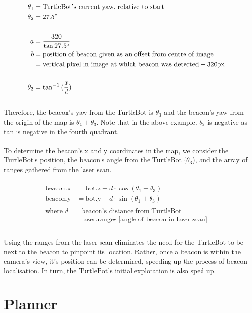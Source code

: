 \documentclass[titlepage,12pt,a4paper]{article}
\begin{document}
\begin{align*}
	\theta_1   &=  \text{TurtleBot's current yaw, relative to start} \\
	\theta_2   &=  27.5\degree \\
	\\
	a 	        &=  \frac{320}{\tan{27.5\degree}} \\ 
	b 	        &=  \text{position of beacon given as an offset from centre of image} \\
			&=  \text{vertical pixel in image at which beacon was detected} - 320\text{px} \\
	\\
	\theta_3   &= \tan^{-1}{(\frac{x}{d})} \\
\end{align*}
\\
Therefore, the beacon's yaw from the TurtleBot is $\theta_3$ and the beacon's yaw from the origin of the map is $\theta_1 + \theta_3$. Note that in the above example, $\theta_3$ is negative as tan is negative in the fourth quadrant.\\
\\
To determine the beacon's x and y coordinates in the map, we consider the TurtleBot's position, the beacon's angle from the TurtleBot ($\theta_3$), and the array of ranges gathered from the laser scan. \\
\\
\begin{align*}
	\text{beacon.x}		&=		\text{bot.x} + d \cdot \cos{(\theta_1 + \theta_3)} \\
	\text{beacon.y} 		&= 		\text{bot.y} + d \cdot \sin{(\theta_1 + \theta_3)} \\
	\\
	\text{where } d 		&=		\text{beacon's distance from TurtleBot} \\
					&=		\text{laser.ranges [angle of beacon in laser scan]}  \\
\end{align*}
\\
Using the ranges from the laser scan eliminates the need for the TurtleBot to be next to the beacon to pinpoint its location. Rather, once a beacon is within the camera's view, it's position can be determined, speeding up the process of beacon localisation. In turn, the TurtleBot's initial exploration is also sped up.


\pagebreak


\section*{Planner}
\end{document}

